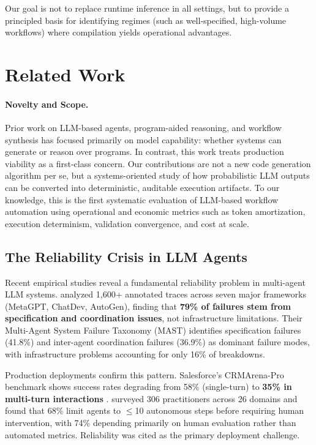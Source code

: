 \documentclass[11pt]{article}
\begin{document}
Our goal is not to replace runtime inference in all settings, but to provide a principled basis for identifying regimes (such as well-specified, high-volume workflows) where compilation yields operational advantages.

\section{Related Work}
\label{sec:related-work}

\paragraph{Novelty and Scope.}
Prior work on LLM-based agents, program-aided reasoning, and workflow synthesis has focused primarily on model capability: whether systems can generate or reason over programs. In contrast, this work treats production viability as a first-class concern. Our contributions are not a new code generation algorithm per se, but a systems-oriented study of how probabilistic LLM outputs can be converted into deterministic, auditable execution artifacts. To our knowledge, this is the first systematic evaluation of LLM-based workflow automation using operational and economic metrics such as token amortization, execution determinism, validation convergence, and cost at scale.

\subsection{The Reliability Crisis in LLM Agents}

Recent empirical studies reveal a fundamental reliability problem in multi-agent LLM systems. \citet{cemri2025multiagent} analyzed 1,600+ annotated traces across seven major frameworks (MetaGPT, ChatDev, AutoGen), finding that \textbf{79\% of failures stem from specification and coordination issues}, not infrastructure limitations. Their Multi-Agent System Failure Taxonomy (MAST) identifies specification failures (41.8\%) and inter-agent coordination failures (36.9\%) as dominant failure modes, with infrastructure problems accounting for only 16\% of breakdowns.

Production deployments confirm this pattern. Salesforce's CRMArena-Pro benchmark shows success rates degrading from 58\% (single-turn) to \textbf{35\% in multi-turn interactions} \citep{salesforce2025agents}. \citet{pan2025measuring} surveyed 306 practitioners across 26 domains and found that 68\% limit agents to $\leq$10 autonomous steps before requiring human intervention, with 74\% depending primarily on human evaluation rather than automated metrics. Reliability was cited as the primary deployment challenge.
\end{document}
